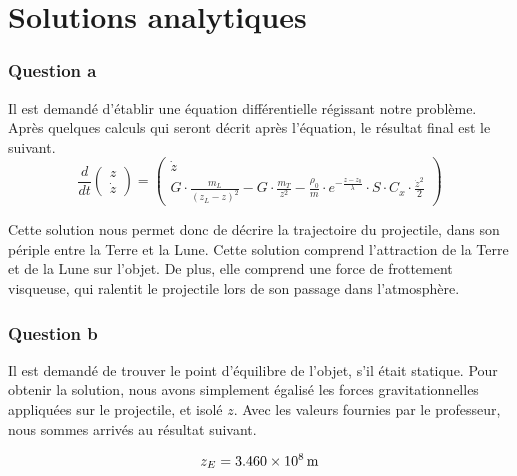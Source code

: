\documentclass[a4paper,12pt,twoside]{article}
\begin{document}
\section{Solutions analytiques}
\subsubsection*{Question a}
Il est demandé d'établir une équation différentielle régissant notre problème.
Après quelques calculs qui seront décrit après l'équation, le résultat final est le suivant.
\begin{equation}
    \frac{d}{dt}
    \begin{pmatrix}
        z \\
        \dot{z}
    \end{pmatrix}
    =
    \begin{pmatrix}
    \dot{z} \\
    G\cdot\frac{m_L}{(z_L - z)^2} - G\cdot\frac{m_T}{z^2} - \frac{\rho_0}{m}\cdot e^{-\frac{z-z_0}{\lambda}}\cdot S\cdot C_x\cdot \frac{\dot{z}^2}{2}
    \end{pmatrix}
    \label{eq:sol}
\end{equation}

Cette solution nous permet donc de décrire la trajectoire du projectile, dans son périple entre la Terre et la Lune.
Cette solution comprend l'attraction de la Terre et de la Lune sur l'objet.
De plus, elle comprend une force de frottement visqueuse, qui ralentit le projectile lors de son passage dans l'atmosphère.\\

\subsubsection*{Question b}
Il est demandé de trouver le point d'équilibre de l'objet, s'il était statique.
Pour obtenir la solution, nous avons simplement égalisé les forces gravitationnelles appliquées sur le projectile, et isolé $z$.
Avec les valeurs fournies par le professeur, nous sommes arrivés au résultat suivant.

\begin{equation}
    z_E = \SI{3.460d8}{\meter}
    \label{val:zE}
\end{equation}
\end{document}
